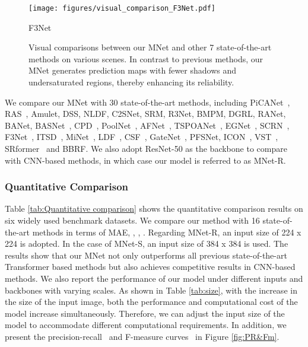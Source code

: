 \documentclass[lettersize,journal]{IEEEtran}
\begin{document}
\begin{figure*}
	\begin{minipage}[t]{0.09\textwidth}
		\centering
		\texttt{[image: figures/visual\_comparison\_F3Net.pdf]}
		\centering\footnotesize{F3Net\par\cite{F3Net}}
	\end{minipage}
	\begin{minipage}[t]{0.1\textwidth}
	\end{minipage}
	\par\;\caption{Visual comparisons between our MNet and other 7 state-of-the-art methods on various scenes. 
		In contrast to previous methods, our MNet generates prediction maps with fewer shadows and undersaturated regions, thereby enhancing its reliability. }
	\label{fig:visualcomparison}
	\vspace{-3mm}
\end{figure*}


We compare our MNet with 30 state-of-the-art methods, including PiCANet~\cite{PiCANet}, RAS~\cite{RAS}, Amulet\cite{Amulet}, DSS\cite{DSS}, NLDF\cite{luo2017non}, C2SNet\cite{xin2018c2s}, SRM\cite{8237695}, R3Net\cite{R3Net}, BMPM\cite{Zhang_2018_CVPR}, DGRL\cite{Wang_2018_CVPR}, RANet\cite{8966594}, BANet\cite{Su_2019_ICCV}, BASNet~\cite{BASNet}, CPD~\cite{CPD}, PoolNet~\cite{PoolNet}, AFNet~\cite{AFNet}, TSPOANet~\cite{TSPOANet}, EGNet~\cite{EGNet}, SCRN~\cite{SCRN}, F3Net~\cite{F3Net}, ITSD~\cite{ITSD}, MiNet~\cite{MiNet}, LDF~\cite{CVPR2020_LDF}, CSF~\cite{gao2020sod100k}, GateNet~\cite{GateNet}, PFSNet\cite{ma2021pyramidal}, ICON~\cite{ICON}, 
VST~\cite{VST}, SRformer~\cite{SelfReformer} and BBRF\cite{BBRF}. 
We also adopt ResNet-50 as the backbone to compare with CNN-based methods, in which case our model is referred to as MNet-R. 

\subsubsection{Quantitative Comparison}

Table \ref{tab:Quantitative comparison} shows the quantitative comparison results on six widely used benchmark datasets. We compare our method with 16 state-of-the-art methods in terms of MAE, , , . 
Regarding MNet-R, an input size of 224 x 224 is adopted. In the case of MNet-S, an input size of 384 x 384 is used. 
The results show that our MNet not only outperforms all previous state-of-the-art Transformer based methods but also achieves competitive results in CNN-based methods. 
We also report the performance of our model under different inputs and backbones with varying scales. 
As shown in Table \ref{tab:size}, with the increase in the size of the input image, both the performance and computational cost of the model increase simultaneously. 
Therefore, we can adjust the input size of the model to accommodate different computational requirements.
In addition, we present the precision-recall~\cite{6871397} and F-measure curves~\cite{Achanta2009FrequencytunedSR} in Figure \ref{fig:PR&Fm}. 
\end{document}
